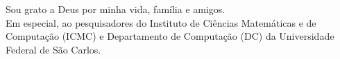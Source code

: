Sou grato a Deus por minha vida, família e amigos. \\
Em especial, ao pesquisadores do Instituto de Ciências Matemáticas e de Computação (ICMC) e Departamento de Computação (DC) da Universidade Federal de São Carlos.
